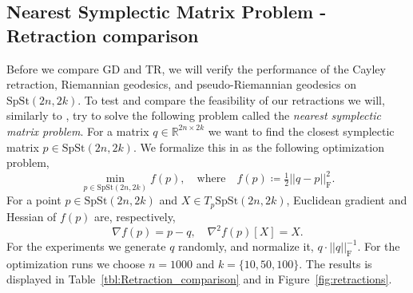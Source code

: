 \subsection{Nearest Symplectic Matrix Problem - Retraction comparison}\label{sec:retraction_comparison}
Before we compare GD and TR, we will verify the performance of the Cayley retraction, Riemannian geodesics, and pseudo-Riemannian geodesics on $\mathrm{SpSt}(2n, 2k)$. 
To test and compare the feasibility of our retractions we will, similarly to \cite[p.~25]{BendokatZimmermann2021}, try to solve the following problem called the \textit{nearest symplectic matrix problem}. For a matrix $q\in \mathbb{R}^{2n\times2k}$ we want to find the closest symplectic matrix $p \in \mathrm{SpSt}(2n, 2k)$. We formalize this in as the following optimization problem, 
%
\begin{equation}\label{eq:nearest_symplectic_matrix}
\operatorname*{min}_{p \in \mathrm{SpSt}(2n, 2k)}f(p),\quad\text{where}\quad f(p)\coloneqq\tfrac{1}{2}\lvert \lvert q-p \rvert \rvert^{2}_{\text{F}}.
\end{equation}
%
For a point $p\in \mathrm{SpSt}(2n, 2k)$ and $X\in T_{p}\mathrm{SpSt}(2n, 2k)$, Euclidean gradient and Hessian of $f(p)$ are, respectively,
%
\begin{equation*}
\nabla f(p)=p-q,\quad \nabla^{2}f(p)[X]=X.
\end{equation*}
%
For the experiments we generate $q$ randomly, and normalize it, $q\cdot\lvert \lvert q \rvert \rvert^{-1}_{\text{F}}$. For the optimization runs we choose $n=1000$ and $k=\{10,50,100\}$. The results is displayed in Table~\ref{tbl:Retraction_comparison} and in Figure~\ref{fig:retractions}. 


